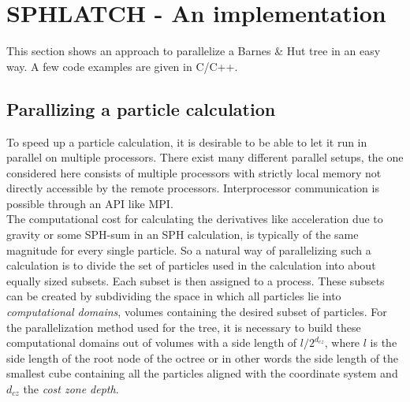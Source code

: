 
\section{SPHLATCH - An implementation}

This section shows an approach to parallelize a Barnes \& Hut tree in an easy way. A few code examples are given in C/C++.

\subsection{Parallizing a particle calculation}
To speed up a particle calculation, it is desirable to be able to let it run in parallel on multiple processors. There exist many different parallel setups, the one considered here consists of multiple processors with strictly local memory not directly accessible by the remote processors. Interprocessor communication is possible through an API like MPI.\\
The computational cost for calculating the derivatives like acceleration due to gravity or some SPH-sum in an SPH calculation, is typically of the same magnitude for every single particle. So a natural way of parallelizing such a calculation is to divide the set of particles used in the calculation into about equally sized subsets. Each subset is then assigned to a process. These subsets can be created by subdividing the space in which all particles lie into \emph{computational domains}, volumes containing the desired subset of particles. For the parallelization method used for the tree, it is necessary to build these computational domains out of volumes with a side length of $l / 2^{d_{cz}}$, where $l$ is the side length of the root node of the octree or in other words the side length of the smallest cube containing all the particles aligned with the coordinate system and $d_{cz}$ the \emph{cost zone depth}. 
